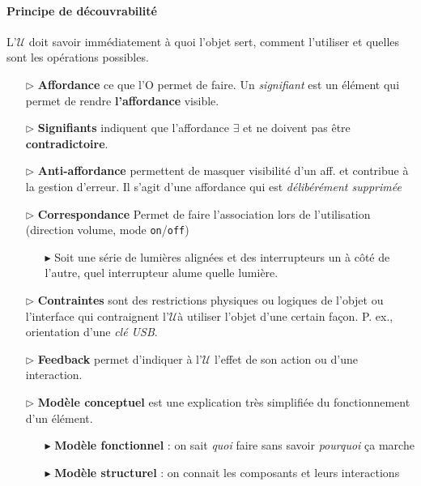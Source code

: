 \documentclass{report}
\begin{document}
\begin{multicols*}{3}
    \paragraph{Principe de découvrabilité}
    L'$\mathcal{U}$ doit savoir immédiatement à quoi l'objet sert, comment 
    l'utiliser et quelles sont les opérations possibles. 

    \begin{itemize}
      \item [$\rhd $]  \textbf{Affordance} ce que l'O permet de faire.  
            Un \textit{signifiant} est un élément qui permet de rendre 
            \textbf{l'affordance} visible.   

      \item [$\rhd $]  \textbf{Signifiants} indiquent que l'affordance 
        $\exists$ et ne doivent pas être \textbf{contradictoire}.   

      \item [$\rhd $]  \textbf{Anti-affordance} permettent de masquer 
        visibilité d'un aff. et contribue à la gestion d'erreur. 
        Il s'agit d'une affordance qui est \textit{délibérément supprimée}

      \item [$\rhd $]   \textbf{Correspondance} Permet de faire 
        l'association lors de l'utilisation 
        (direction volume, mode \texttt{on}/\texttt{off})
        \begin{itemize}
          \item [$\blacktriangleright$] Soit une série de lumières alignées et des interrupteurs un à côté 
            de l'autre, quel interrupteur alume quelle lumière. 
        \end{itemize}
        
        \item [$\rhd$ ] \textbf{Contraintes}  
          sont des restrictions physiques ou logiques de l'objet ou l'interface 
          qui contraignent l'$\mathcal{U}$à utiliser l'objet d'une certain façon. 
          P. ex., orientation d'une \textit{clé USB}.   

        \item [$\rhd$ ] \textbf{Feedback} permet d'indiquer à l'$\mathcal{U}$     
          l'effet de son action ou d'une interaction. 

        \item [$\rhd$ ] \textbf{Modèle conceptuel} est une explication très simplifiée 
          du fonctionnement d'un élément. 
          \begin{itemize}
            \item [$\blacktriangleright$ ] \textbf{Modèle fonctionnel} : on sait \textit{quoi} 
              faire sans savoir \textit{pourquoi} ça marche       
            \item [$\blacktriangleright$ ] \textbf{Modèle structurel} : on connait 
              les composants et leurs interactions
          \end{itemize}
        

\end{itemize}
\end{multicols*}
\end{document}
